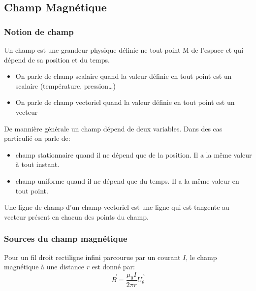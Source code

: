 \subsection{Champ Magnétique}

\subsubsection{Notion de champ}

\begin{definition}
    Un champ est une grandeur physique définie ne tout point M de l'espace et qui dépend de sa position et du temps.
    \begin{itemize}
        \item On parle de champ scalaire quand la valeur définie en tout point est un scalaire (température, pression\dots)
        \item On parle de champ vectoriel quand la valeur définie en tout point est un vecteur
    \end{itemize}
\end{definition}

\begin{definition}
    De mannière générale un champ dépend de deux variables. Dans des cas particulié on parle de:
    \begin{itemize}
        \item champ stationnaire quand il ne dépend que de la position. Il a la même valeur à tout instant.
        \item champ uniforme quand il ne dépend que du temps. Il a la même valeur en tout point.
    \end{itemize}
\end{definition}

\begin{definition}
    Une ligne de champ d'un champ vectoriel est une ligne qui est tangente au vecteur présent en chacun des points du champ.
\end{definition}

\subsubsection{Sources du champ magnétique}

\begin{proposition}
    Pour un fil droit rectiligne infini parcourue par un courant $I$, le champ magnétique à une distance $r$ est donné par:
    \[ \vec{B} = \frac{\mu_{0} I}{2\pi r} \vec{U_{\theta}}\]
\end{proposition}

